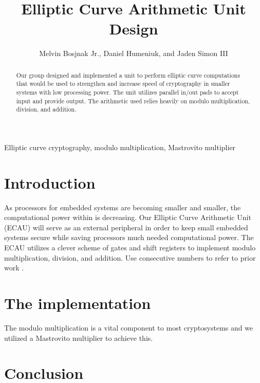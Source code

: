 \documentclass{IEEEtran}
\begin{document}
\title{  Elliptic Curve Arithmetic Unit Design }

\author{Melvin Bosjnak Jr., Daniel Humeniuk, and Jaden Simon III}

\maketitle

\begin{abstract}

Our group designed and implemented a unit to perform elliptic curve computations that would be used to strengthen and increase speed of cryptography in smaller systems with low processing power. The unit utilizes parallel in/out pads to accept input and provide output. The arithmetic used relies heavily on modulo multiplication, division, and addition.  

\end{abstract}

\begin{IEEEkeywords}
Elliptic curve cryptography, modulo multiplication, Mastrovito multiplier

\end{IEEEkeywords}

\section{Introduction}

As processors for embedded systems are becoming smaller and smaller, the computational power within is decreasing. Our Elliptic Curve Arithmetic Unit (ECAU) will serve as an external peripheral in order to keep small embedded systems secure while saving processors much needed computational power. The ECAU utilizes a clever scheme of gates and shift registers to implement modulo multiplication, division, and addition. 
Use consecutive numbers to refer to prior work \cite{Ajay}.

\section{The implementation}

The modulo multiplication is a vital component to most cryptosystems \cite{Kallabook} and we utilized a Mastrovito multiplier to achieve this.


\section{Conclusion}



\end{document}
